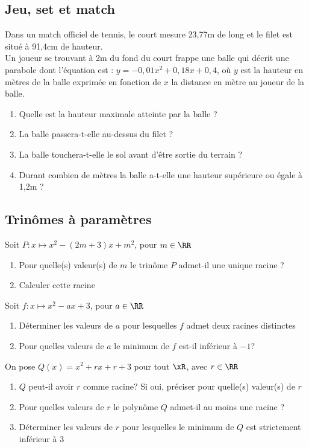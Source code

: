 \documentclass[oneside,12pt]{book}          %
\begin{document}
\subsection{Jeu, set et match}
Dans un match officiel de tennis, le court mesure 23,77m de long et le filet est situé à 91,4cm de hauteur.\\
Un joueur se trouvant à 2m du fond du court frappe une balle qui décrit une parabole dont l'équation est : $y=-0,01x^2+0,18x+0,4$, où $y$ est la hauteur en mètres de la balle exprimée en fonction de $x$ la distance en mètre au joueur de la balle.
\begin{enumerate}
	\item Quelle est la hauteur maximale atteinte par la balle ?
	\item La balle passera-t-elle au-dessus du filet ?
	\item La balle touchera-t-elle le sol avant d'être sortie du terrain ?
	\item Durant combien de mètres la balle a-t-elle une hauteur supérieure ou égale à 1,2m ?
\end{enumerate}

\subsection{Trinômes à paramètres}

 Soit $P:x\mapsto x^{2} -(2m+3)x +m^{2}$, pour $m\in\RR$ 
\begin{enumerate}
    \item Pour quelle(s) valeur(s) de $m$ le trinôme $P$ admet-il une unique racine ?
    \item Calculer cette racine
\end{enumerate}

 Soit $f:x\mapsto x^{2} -ax +3$, pour $a\in\RR$
\begin{enumerate}
    \item Déterminer les valeurs de $a$ pour lesquelles $f$ admet deux racines distinctes
    \item Pour quelles valeurs de $a$ le minimum de $f$ est-il inférieur à $-1$?
\end{enumerate}

 On pose $Q(x)=x^2+rx+r+3$ pour tout $\xR$, avec $r\in\RR$
\begin{enumerate}
    \item $Q$ peut-il avoir $r$ comme racine? Si oui, préciser pour quelle(s) valeur(s) de $r$
    \item Pour quelles valeurs de $r$ le polynôme $Q$ admet-il au moins une racine ?
    \item Déterminer les valeurs de $r$ pour lesquelles le minimum de $Q$ est strictement inférieur à 3
\end{enumerate}
\end{document}

